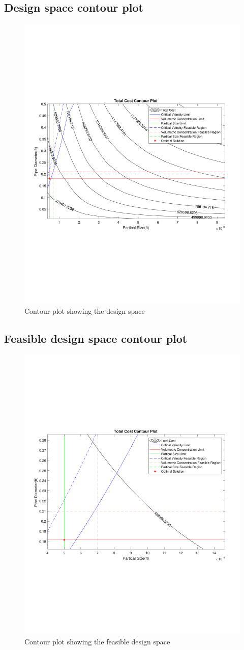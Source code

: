 \documentclass{article}
\begin{document}
\subsection{Design space contour plot}
\begin{figure}[H]
    \centering
    \includegraphics[width=3.in]{PlotBig.pdf}
    \caption{Contour plot showing the design space}
    \label{fig:big}
\end{figure}

\subsection{Feasible design space contour plot}
\begin{figure}[H]
    \centering
    \includegraphics[width=3.in]{PlotZoomed.pdf}
    \caption{Contour plot showing the feasible design space}
    \label{fig:close}
\end{figure}
\end{document}
